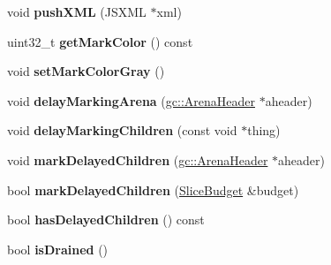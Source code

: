 \begin{DoxyCompactItemize}
\item 
\hypertarget{structjs_1_1_g_c_marker_a9941671c7d3635f9ae99f7470d79093a}{void {\bfseries push\-X\-M\-L} (J\-S\-X\-M\-L $\ast$xml)}\label{structjs_1_1_g_c_marker_a9941671c7d3635f9ae99f7470d79093a}

\item 
\hypertarget{structjs_1_1_g_c_marker_ac05597bfc32c7776e556b7ccbae80d7a}{uint32\-\_\-t {\bfseries get\-Mark\-Color} () const }\label{structjs_1_1_g_c_marker_ac05597bfc32c7776e556b7ccbae80d7a}

\item 
\hypertarget{structjs_1_1_g_c_marker_aa1d957ccfb38ef4d32ce4f56b7317f4d}{void {\bfseries set\-Mark\-Color\-Gray} ()}\label{structjs_1_1_g_c_marker_aa1d957ccfb38ef4d32ce4f56b7317f4d}

\item 
\hypertarget{structjs_1_1_g_c_marker_a654c4a1f4e616ba611f75fcaac6d61e7}{void {\bfseries delay\-Marking\-Arena} (\hyperlink{structjs_1_1gc_1_1_arena_header}{gc\-::\-Arena\-Header} $\ast$aheader)}\label{structjs_1_1_g_c_marker_a654c4a1f4e616ba611f75fcaac6d61e7}

\item 
\hypertarget{structjs_1_1_g_c_marker_a993a2e9185af56ca48c673b49aa50369}{void {\bfseries delay\-Marking\-Children} (const void $\ast$thing)}\label{structjs_1_1_g_c_marker_a993a2e9185af56ca48c673b49aa50369}

\item 
\hypertarget{structjs_1_1_g_c_marker_a69ac1ed55a33c78b1e81c659d2125276}{void {\bfseries mark\-Delayed\-Children} (\hyperlink{structjs_1_1gc_1_1_arena_header}{gc\-::\-Arena\-Header} $\ast$aheader)}\label{structjs_1_1_g_c_marker_a69ac1ed55a33c78b1e81c659d2125276}

\item 
\hypertarget{structjs_1_1_g_c_marker_a21ec8c9a8f015fd1c7ece55c011ab45e}{bool {\bfseries mark\-Delayed\-Children} (\hyperlink{structjs_1_1_slice_budget}{Slice\-Budget} \&budget)}\label{structjs_1_1_g_c_marker_a21ec8c9a8f015fd1c7ece55c011ab45e}

\item 
\hypertarget{structjs_1_1_g_c_marker_a7aa450235440d5ca0e74d9130ec9d105}{bool {\bfseries has\-Delayed\-Children} () const }\label{structjs_1_1_g_c_marker_a7aa450235440d5ca0e74d9130ec9d105}

\item 
\hypertarget{structjs_1_1_g_c_marker_aa31143b8a366ce0f6bde2e5bd356fafc}{bool {\bfseries is\-Drained} ()}\label{structjs_1_1_g_c_marker_aa31143b8a366ce0f6bde2e5bd356fafc}


\end{DoxyCompactItemize}
